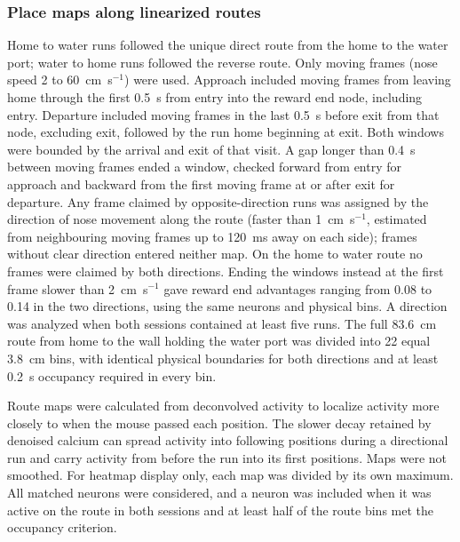 \documentclass[fleqn,10pt]{wlscirep}
\begin{document}
\subsubsection*{Place maps along linearized routes}

Home to water runs followed the unique direct route from the home to the water port; water to home runs followed the reverse route. Only moving frames (nose speed 2 to 60~cm~s$^{-1}$) were used. Approach included moving frames from leaving home through the first 0.5~s from entry into the reward end node, including entry. Departure included moving frames in the last 0.5~s before exit from that node, excluding exit, followed by the run home beginning at exit. Both windows were bounded by the arrival and exit of that visit. A gap longer than 0.4~s between moving frames ended a window, checked forward from entry for approach and backward from the first moving frame at or after exit for departure. Any frame claimed by opposite-direction runs was assigned by the direction of nose movement along the route (faster than 1~cm~s$^{-1}$, estimated from neighbouring moving frames up to 120~ms away on each side); frames without clear direction entered neither map. On the home to water route no frames were claimed by both directions. Ending the windows instead at the first frame slower than 2~cm~s$^{-1}$ gave reward end advantages ranging from 0.08 to 0.14 in the two directions, using the same neurons and physical bins. A direction was analyzed when both sessions contained at least five runs. The full 83.6~cm route from home to the wall holding the water port was divided into 22 equal 3.8~cm bins, with identical physical boundaries for both directions and at least 0.2~s occupancy required in every bin.

Route maps were calculated from deconvolved activity to localize activity more closely to when the mouse passed each position. The slower decay retained by denoised calcium can spread activity into following positions during a directional run and carry activity from before the run into its first positions. Maps were not smoothed. For heatmap display only, each map was divided by its own maximum. All matched neurons were considered, and a neuron was included when it was active on the route in both sessions and at least half of the route bins met the occupancy criterion.
\end{document}
